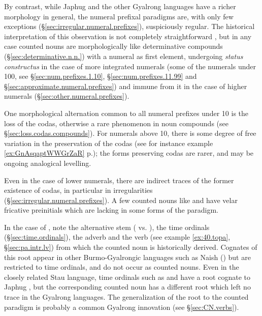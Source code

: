 By contrast, while Japhug and the other Gyalrong languages have a richer morphology in general, the numeral prefixal paradigms are, with only few exceptions (§\ref{sec:irregular.numeral.prefixes}), suspiciously regular. The historical interpretation of this observation is not completely straightforward \citep{jacques17num}, but in any case counted nouns are morphologically like determinative compounds (§\ref{sec:determinative.n.n.}) with a numeral as first element, undergoing \textit{status constructus} in the case of more integrated numerals (some of the numerals under 100, see §\ref{sec:num.prefixes.1.10},  §\ref{sec:num.prefixes.11.99} and §\ref{sec:approximate.numeral.prefixes}) and immune from it in the case of higher numerals (§\ref{sec:other.numeral.prefixes}).

One morphological alternation common to all numeral prefixes under 10 is the loss of the codas, otherwise a rare phenomenon in noun compounds (see §\ref{sec:loss.codas.compounds}). For numerals above 10, there is some degree of free variation in the preservation of the codas (see for instance example \ref{ex:GnAsqaptWWGrZaR} p.\pageref{ex:GnAsqaptWWGrZaR}); the forms preserving codas are rarer, and may be ongoing analogical levelling.

Even in the case of lower numerals, there are indirect traces of the former existence of codas, in particular in irregularities (§\ref{sec:irregular.numeral.prefixes}). A few counted nouns like  and  have velar fricative preinitials  which are lacking in some forms of the paradigm. 

In the case of , note the alternative stem  ( vs. ), the time ordinals (§\ref{sec:time.ordinals}), the adverb  and the verb   (see example \ref{ex:40.topa}, §\ref{sec:pa.intr.lv}) from which the counted noun  is historically derived. Cognates of this root  appear in other Burmo-Gyalrongic languages such as Naish (\citealt{jacques.michaud11naish}) but are restricted to time ordinals, and do not occur as counted nouns. Even in the closely related Stau language,  time ordinals such as  and  have a root  cognate to Japhug , but the corresponding counted noun  has a different root which left no trace in the Gyalrong languages. The generalization of the  root to the counted paradigm is probably a common Gyalrong innovation (see §\ref{sec:CN.verbs}). 

